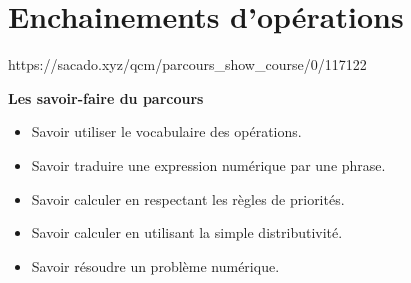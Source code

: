 \chapter{Enchainements d'opérations}
{https://sacado.xyz/qcm/parcours_show_course/0/117122}
{

 \begin{CpsCol}
\textbf{Les savoir-faire du parcours}
 \begin{itemize}
 \item Savoir utiliser le vocabulaire des opérations.
 \item Savoir traduire une expression numérique par une phrase.
 \item Savoir calculer en respectant les règles de priorités.
 \item Savoir calculer en utilisant la simple distributivité.
 \item Savoir résoudre un problème numérique.
 \end{itemize}
 \end{CpsCol}
}

